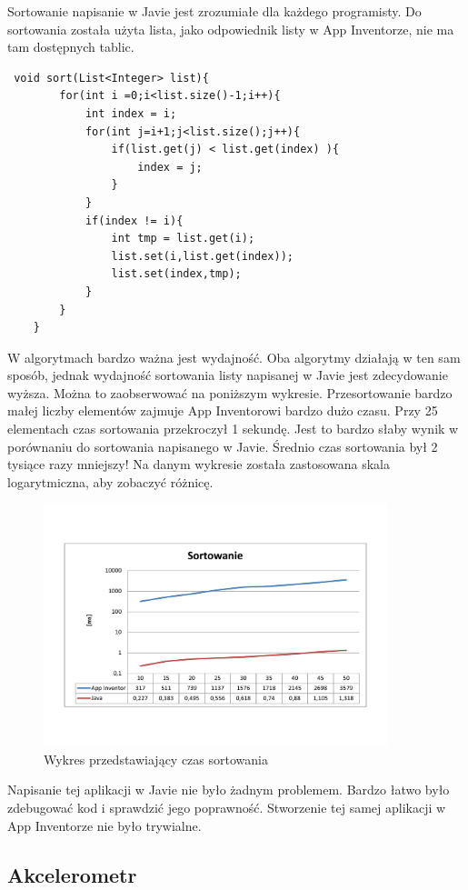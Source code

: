 Sortowanie napisanie w Javie jest zrozumiałe dla każdego programisty. Do sortowania została użyta lista, jako odpowiednik listy w App Inventorze, nie ma tam dostępnych tablic.


\begin{lstlisting}
 void sort(List<Integer> list){
        for(int i =0;i<list.size()-1;i++){
            int index = i;
            for(int j=i+1;j<list.size();j++){
                if(list.get(j) < list.get(index) ){
                    index = j;
                }
            }
            if(index != i){
                int tmp = list.get(i);
                list.set(i,list.get(index));
                list.set(index,tmp);
            }
        }
    }
\end{lstlisting}

W algorytmach bardzo ważna jest wydajność. Oba algorytmy działają w ten sam sposób, jednak wydajność sortowania listy napisanej w Javie jest zdecydowanie wyższa. Można to zaobserwować na poniższym wykresie. Przesortowanie bardzo małej liczby elementów zajmuje App Inventorowi bardzo dużo czasu. Przy 25 elementach czas sortowania przekroczył 1 sekundę. Jest to bardzo słaby wynik w porównaniu do sortowania napisanego w Javie. Średnio czas sortowania był 2 tysiące razy mniejszy! Na danym wykresie została zastosowana skala logarytmiczna, aby zobaczyć różnicę.

\begin{figure}[htbp]
\centering\includegraphics[width=10cm]{figures/apps/sortChart}
\caption{Wykres przedstawiający czas sortowania}
\end{figure}

Napisanie tej aplikacji w Javie nie było żadnym problemem. Bardzo łatwo było zdebugować kod i sprawdzić jego poprawność. Stworzenie tej samej aplikacji w App Inventorze nie było trywialne.


\subsection{Akcelerometr}

